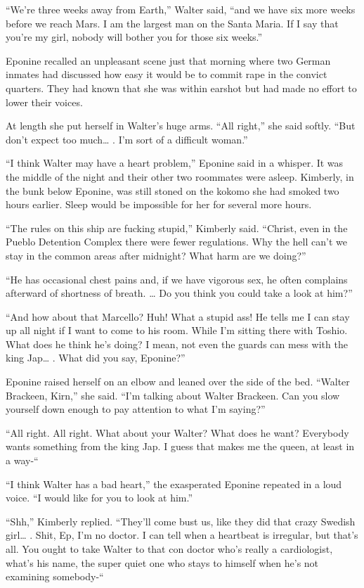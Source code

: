 \documentclass[]{article}
\begin{document}
{“We’re three weeks away from Earth,” Walter said, “and we have six more weeks before we reach Mars. I am the largest man on the Santa Maria. If I say that you’re my girl, nobody will bother you for those six weeks.”

Eponine recalled an unpleasant scene just that morning where two German inmates had discussed how easy it would be to commit rape in the convict quarters. They had known that she was within earshot but had made no effort to lower their voices.

At length she put herself in Walter’s huge arms. “All right,” she said softly. “But don’t expect too much… . I’m sort of a difficult woman.”

“I think Walter may have a heart problem,” Eponine said in a whisper. It was the middle of the night and their other two roommates were asleep. Kimberly, in the bunk below Eponine, was still stoned on the kokomo she had smoked two hours earlier. Sleep would be impossible for her for several more hours.

“The rules on this ship are fucking stupid,” Kimberly said. “Christ, even in the Pueblo Detention Complex there were fewer regulations. Why the hell can’t we stay in the common areas after midnight? What harm are we doing?”

“He has occasional chest pains and, if we have vigorous sex, he often complains afterward of shortness of breath. … Do you think you could take a look at him?”

“And how about that Marcello? Huh! What a stupid ass! He tells me I can stay up all night if I want to come to his room. While I’m sitting there with Toshio. What does he think he’s doing? I mean, not even the guards can mess with the king Jap… . What did you say, Eponine?”

Eponine raised herself on an elbow and leaned over the side of the bed. “Walter Brackeen, Kirn,” she said. “I’m talking about Walter Brackeen. Can you slow yourself down enough to pay attention to what I’m saying?”

“All right. All right. What about your Walter? What does he want? Everybody wants something from the king Jap. I guess that makes me the queen, at least in a way-“

“I think Walter has a bad heart,” the exasperated Eponine repeated in a loud voice. “I would like for you to look at him.”

“Shh,” Kimberly replied. “They’ll come bust us, like they did that crazy Swedish girl… . Shit, Ep, I’m no doctor. I can tell when a heartbeat is irregular, but that’s all. You ought to take Walter to that con doctor who’s really a cardiologist, what’s his name, the super quiet one who stays to himself when he’s not examining somebody-“

}
\end{document}
